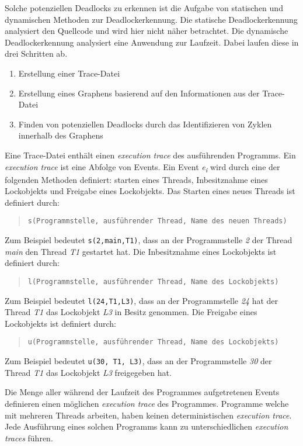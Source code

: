 Solche potenziellen Deadlocks zu erkennen ist die Aufgabe von statischen und
dynamischen Methoden zur Deadlockerkennung. Die statische Deadlockerkennung
analysiert den Quellcode und wird hier nicht näher betrachtet. Die dynamische
Deadlockerkennung analysiert eine Anwendung zur Laufzeit. Dabei laufen diese in
drei Schritten ab.
\begin{enumerate}
  \item Erstellung einer Trace-Datei
  \item Erstellung eines Graphens basierend auf den Informationen aus der
  Trace-Datei
  \item Finden von potenziellen Deadlocks durch das Identifizieren von Zyklen
  innerhalb des Graphens
\end{enumerate}

Eine Trace-Datei enthält einen \textit{execution trace} des ausführenden
Programms. Ein \textit{execution trace} ist eine Abfolge von Events. Ein Event
\textit{e\textsubscript{i}} wird durch eine der folgenden Methoden definiert:
starten eines Threads, Inbesitznahme eines Lockobjekts und Freigabe eines
Lockobjekts. Das Starten eines neues Threads ist definiert durch:
\begin{quote}
\texttt{s(Programmstelle, ausführender Thread, Name des neuen Threads)}
\end{quote}
Zum Beispiel bedeutet \texttt{s(2,main,T1)}, dass an der Programmstelle
\textit{2} der Thread \textit{main} den Thread \textit{T1} gestartet hat. 
Die Inbesitznahme eines Lockobjekts ist definiert durch:
\begin{quote}
\texttt{l(Programmstelle, ausführender Thread, Name des Lockobjekts)}
\end{quote}
Zum Beispiel bedeutet \texttt{l(24,T1,L3)}, dass
an der Programmstelle \textit{24} hat der Thread \textit{T1} das Lockobjekt
\textit{L3} in Besitz genommen. Die Freigabe eines Lockobjekts ist definiert
durch:
\begin{quote}
\texttt{u(Programmstelle, ausführender Thread, Name des Lockobjekts)}
\end{quote}
Zum Beispiel bedeutet \texttt{u(30, T1, L3)}, dass an der Programmstelle
\textit{30} der Thread \textit{T1} das Lockobjekt \textit{L3} freigegeben hat.

Die Menge aller während der Laufzeit des Programmes aufgetretenen Events
definieren einen möglichen \textit{execution trace} des Programmes.
Programme welche mit mehreren Threads arbeiten, haben keinen deterministischen
\textit{execution trace}. Jede Ausführung eines solchen Programms kann zu
unterschiedlichen \textit{execution traces} führen. 

